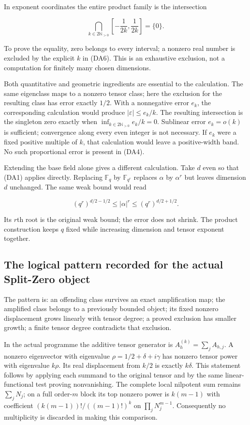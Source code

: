 In exponent coordinates the entire product family is the intersection

\[\bigcap_{k\in2\mathbb N_{>0}}
\left[-\frac1{2k},\frac1{2k}\right]=\{0\}.\tag{DA8}\]

To prove the equality, zero belongs to every interval; a nonzero real
number is excluded by the explicit \(k\) in (DA6). This is an exhaustive
exclusion, not a computation for finitely many chosen dimensions.

Both quantitative and geometric ingredients are essential to the
calculation. The same eigenclass maps to a nonzero tensor class; here
the exclusion for the resulting class has error exactly \(1/2\). With a
nonnegative error \(e_k\), the corresponding calculation would produce
\(|\varepsilon|\le e_k/k\). The resulting intersection is the singleton
zero exactly when \(\inf_{k\in2\mathbb N_{>0}}e_k/k=0\). Sublinear error
\(e_k=o(k)\) is sufficient; convergence along every even integer is not
necessary. If \(e_k\) were a fixed positive multiple of \(k\), that
calculation would leave a positive-width band. No such proportional
error is present in (DA4).

Extending the base field alone gives a different calculation. Take \(d\)
even so that (DA1) applies directly. Replacing \(\mathbb F_q\) by
\(\mathbb F_{q^r}\) replaces \(\alpha\) by \(\alpha^r\) but leaves
dimension \(d\) unchanged. The same weak bound would read

\[(q^r)^{d/2-1/2}\le|\alpha|^r\le(q^r)^{d/2+1/2}.\]

Its \(r\)th root is the original weak bound; the error does not shrink.
The product construction keeps \(q\) fixed while increasing dimension
and tensor exponent together.

\subsection{The logical pattern recorded for the actual Split-Zero
object}\label{the-logical-pattern-recorded-for-the-actual-split-zero-object}

The pattern is: an offending class survives an exact amplification map;
the amplified class belongs to a previously bounded object; its fixed
nonzero displacement grows linearly with tensor degree; a proved
exclusion has smaller growth; a finite tensor degree contradicts that
exclusion.

In the actual programme the additive tensor generator is
\(A_h^{(k)}=\sum_j A_{h,j}\). A nonzero eigenvector with eigenvalue
\(\rho=1/2+\delta+i\gamma\) has nonzero tensor power with eigenvalue
\(k\rho\). Its real displacement from \(k/2\) is exactly \(k\delta\).
This statement follows by applying each summand to the original tensor
and by the same linear-functional test proving nonvanishing. The
complete local nilpotent sum remains \(\sum_jN_j\); on a full
order-\(m\) block its top nonzero power is \(k(m-1)\) with coefficient
\((k(m-1))!/((m-1)!)^k\) on \(\prod_jN_j^{m-1}\). Consequently no
multiplicity is discarded in making this comparison.

